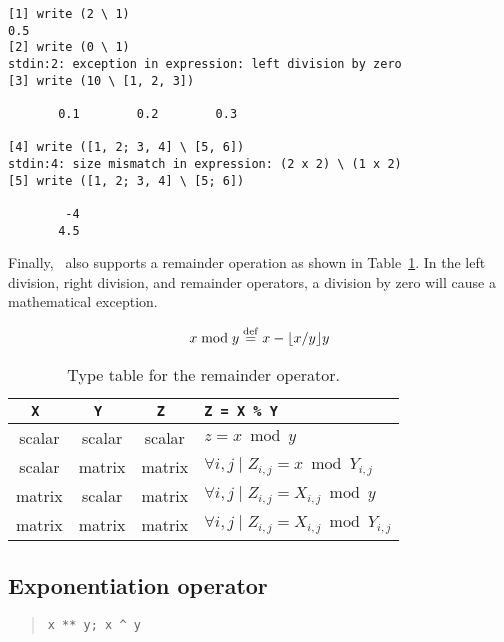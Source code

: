 \begin{screen}
\begin{verbatim}
[1] write (2 \ 1)
0.5
[2] write (0 \ 1)
stdin:2: exception in expression: left division by zero
[3] write (10 \ [1, 2, 3])

       0.1        0.2        0.3 

[4] write ([1, 2; 3, 4] \ [5, 6])
stdin:4: size mismatch in expression: (2 x 2) \ (1 x 2)
[5] write ([1, 2; 3, 4] \ [5; 6])

        -4 
       4.5 
\end{verbatim}
\end{screen}

Finally, \burlap\ also supports a remainder operation as shown in
Table~\ref{burlap.remainder.types}.  In the left division, right
division, and remainder operators, a division by zero will cause a
mathematical exception.

\begin{displaymath}
x \bmod y \stackrel{\rm def}{=}
x - \lfloor x / y \rfloor y
\end{displaymath}

\begin{table}[htbp]
\begin{center}
\begin{tabular}{c|c|c|l}
\tt X  & \tt Y	& \tt Z  & \tt Z = X \% Y				      \\
\hline
scalar & scalar & scalar & $z = x \bmod y$				      \\
scalar & matrix	& matrix & $\forall i,j \mid Z_{i,j} = x \bmod Y_{i,j}$	      \\
matrix & scalar	& matrix & $\forall i,j \mid Z_{i,j} = X_{i,j} \bmod y$	      \\
matrix & matrix	& matrix & $\forall i,j \mid Z_{i,j} = X_{i,j} \bmod Y_{i,j}$ \\
\end{tabular}
\caption{Type table for the remainder operator.}
\label{burlap.remainder.types}
\end{center}
\end{table}


\subsection{Exponentiation operator}
\label{burlap.op.exponentiation}

\begin{quote}
\begin{verbatim}
x ** y; x ^ y
\end{verbatim}
\end{quote}

